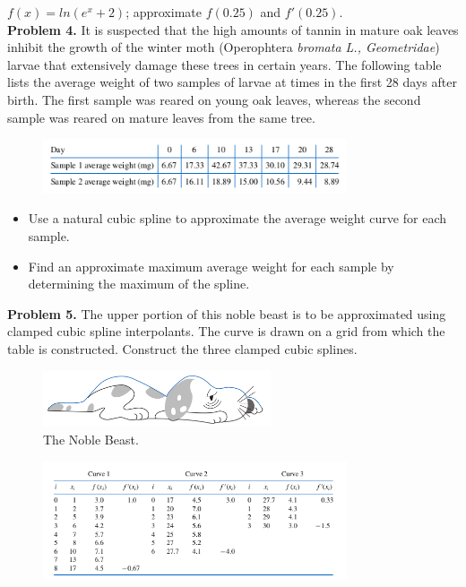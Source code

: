 \documentclass[paper=a4, fontsize=11pt]{scrartcl}
\numberwithin{equation}{section} %
\numberwithin{figure}{section} %
\numberwithin{table}{section} %
\begin{document}
$f(x) = ln(e^{x} + 2)$; approximate $f(0.25)$ and $f'(0.25)$.\\

\large \textbf{Problem 4.}
It is suspected that the high amounts of tannin in mature oak leaves inhibit the growth of the winter moth (Operophtera \textit{bromata L., Geometridae}) larvae that extensively damage these trees in certain years. The following table lists the average weight of two samples of larvae at times in the first 28 days after birth. The first sample was reared on young oak leaves, whereas the second sample was reared on mature leaves from the same tree.
\begin{figure}
	\centering
	\includegraphics[width=0.8\textwidth]
		{data4.png}
\end{figure}
\begin{itemize}
\item Use a natural cubic spline to approximate the average weight curve for each sample.
\item Find an approximate maximum average weight for each sample by determining the maximum of the spline.
\end{itemize}

\large \textbf{Problem 5.}
The upper portion of this noble beast is to be approximated using clamped cubic spline interpolants. The curve is drawn on a grid from which the table is constructed. Construct the three clamped cubic splines.\\
\begin{figure}
	\centering
	\includegraphics[width=0.6\textwidth]
		{puppy.png}
	\caption{The Noble Beast.}
\end{figure}
\begin{figure}
	\centering
	\includegraphics[width=0.8\textwidth]
		{data5.png}
\end{figure}
\end{document}
